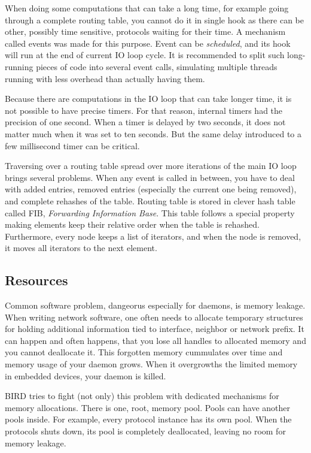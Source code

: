 When doing some computations that can take a long time, for example going
through a complete routing table, you cannot do it in single hook as there can be
other, possibly time sensitive, protocols waiting for their time. A mechanism
called events was made for this purpose. Event can be \emph{scheduled},
and its hook will run at the end of current IO loop cycle. It is recommended to
split such long-running pieces of code into several event calls, simulating
multiple threads running with less overhead than actually having them.

Because there are computations in the IO loop that can take longer time, it is
not possible to have precise timers. For that reason, internal timers had the
precision of one second. When a timer is delayed by two seconds, it does not
matter much when it was set to ten seconds. But the same delay introduced to
a few millisecond timer can be critical.

Traversing over a routing table spread over more iterations of the main IO loop
brings several problems. When any event is called in between, you have to deal
with added entries, removed entries (especially the current one being removed),
and complete rehashes of the table. Routing table is stored in clever hash
table called FIB, \emph{Forwarding Information Base}. This table follows
a special property making elements keep their relative order when the table is
rehashed. Furthermore, every node keeps a list of iterators, and when the node
is removed, it moves all iterators to the next element.

\subsection{Resources}
Common software problem, dangeorus especially for daemons, is memory leakage.
When writing network software, one often needs to allocate temporary structures
for holding additional information tied to interface, neighbor or network
prefix. It can happen and often happens, that you lose all handles to allocated
memory and you cannot deallocate it. This forgotten memory cummulates over time
and memory usage of your daemon grows. When it overgrowths the limited memory
in embedded devices, your daemon is killed.

BIRD tries to fight (not only) this problem with dedicated mechanisms for
memory allocations. There is one, root, memory pool. Pools can have another
pools inside. For example, every protocol instance has its own pool. When the
protocols shuts down, its pool is completely deallocated, leaving no room for
memory leakage.

